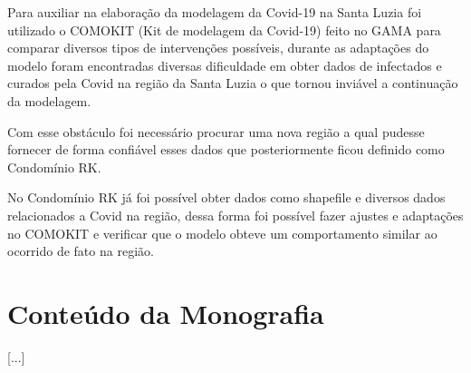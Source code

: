 Para auxiliar na elaboração da modelagem da Covid-19 na Santa Luzia foi utilizado o COMOKIT (Kit de modelagem da Covid-19) feito no GAMA para comparar diversos tipos de intervenções possíveis, durante as adaptações do modelo foram encontradas diversas dificuldade em obter dados de infectados e curados pela Covid na região da Santa Luzia o que tornou inviável a continuação da modelagem.

Com esse obstáculo foi necessário procurar uma nova região a qual pudesse fornecer de forma confiável esses dados que posteriormente ficou definido como Condomínio RK.

No Condomínio RK já foi possível obter dados como shapefile e diversos dados relacionados a Covid na região, dessa forma foi possível fazer ajustes e adaptações no COMOKIT e verificar que o modelo obteve um comportamento similar ao ocorrido de fato na região.

\section{Conteúdo da Monografia}%
[...]


